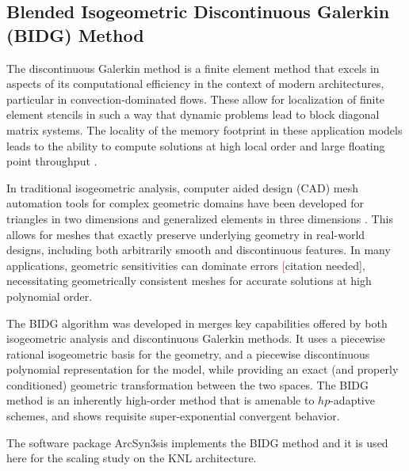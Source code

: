 \subsection{Blended Isogeometric Discontinuous Galerkin (BIDG) Method}
\label{sec:isogeometric}

The discontinuous Galerkin method is a finite element method that excels in
aspects of its computational efficiency in the context of modern architectures,
particular in convection-dominated flows.  These allow for localization of
finite element stencils in such a way that dynamic problems lead to block
diagonal matrix systems.  The locality of the memory footprint in these
application models leads to the ability to compute solutions at high local
order and large floating point throughput \cite{Klockner20097863}.

In traditional isogeometric analysis, computer aided design (CAD) mesh
automation tools for complex geometric domains have been developed for
triangles in two dimensions \cite{Engvall2016378} and generalized elements in
three dimensions \cite{EngvallPress}.  This allows for meshes that exactly
preserve underlying geometry in real-world designs, including both arbitrarily
smooth and discontinuous features.  In many applications, geometric
sensitivities can dominate errors \textcolor{red}[citation needed],
necessitating geometrically consistent meshes for accurate solutions at high
polynomial order.

The BIDG algorithm was developed in \cite{Michoski2016658} merges key
capabilities offered by both isogeometric analysis and discontinuous Galerkin
methods.  It uses a piecewise rational isogeometric basis for the geometry, and
a piecewise discontinuous polynomial representation for the model, while
providing an exact (and properly conditioned) geometric transformation between
the two spaces. The BIDG method is an inherently high-order method that is
amenable to $hp$-adaptive schemes, and shows requisite super-exponential
convergent behavior.

The software package ArcSyn3sis implements the BIDG method and it is used here
for the scaling study on the KNL architecture.

